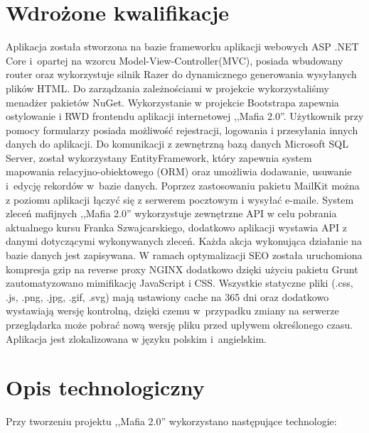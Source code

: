 \documentclass[12pt,a4paper]{article}
\begin{document}
	\section{Wdrożone kwalifikacje}	
		\indent Aplikacja została stworzona na bazie frameworku aplikacji webowych ASP .NET Core i~opartej na wzorcu Model-View-Controller(MVC), posiada wbudowany router oraz wykorzystuje
		silnik Razer do dynamicznego generowania wysyłanych plików HTML.
		Do zarządzania zależnościami w projekcie wykorzystaliśmy menadżer pakietów NuGet.
		Wykorzystanie w projekcie Bootstrapa zapewnia ostylowanie i RWD frontendu aplikacji internetowej ,,Mafia 2.0''.
		Użytkownik przy pomocy formularzy posiada możliwość rejestracji, logowania i przesyłania innych danych do aplikacji.
		Do komunikacji z zewnętrzną bazą danych Microsoft SQL Server, został wykorzystany EntityFramework, który zapewnia system mapowania relacyjno-obiektowego (ORM)
		oraz umożliwia dodawanie, usuwanie i~edycję rekordów w~bazie danych.
		Poprzez zastosowaniu pakietu MailKit można z poziomu aplikacji łączyć się z serwerem pocztowym i wysyłać e-maile.
		System zleceń mafijnych ,,Mafia 2.0'' wykorzystuje zewnętrzne API w celu pobrania aktualnego kursu Franka Szwajcarskiego, dodatkowo aplikacji wystawia API z danymi
		dotyczącymi wykonywanych zleceń.
		Każda akcja wykonująca działanie na bazie danych jest zapisywana.
		W ramach optymalizacji SEO została uruchomiona kompresja gzip na reverse proxy NGINX dodatkowo dzięki użyciu pakietu Grunt zautomatyzowano mimifikację JavaScript i CSS.
		Wszystkie statyczne pliki (.css, .js, .png, .jpg, .gif, .svg) mają ustawiony cache na 365 dni oraz dodatkowo wystawiają wersję kontrolną, dzięki czemu w~przypadku zmiany na serwerze
		przeglądarka może pobrać nową wersję pliku przed upływem określonego czasu. Aplikacja jest zlokalizowana w języku polskim i~angielskim.
	\newpage

	\section{Opis technologiczny}
		\indent Przy tworzeniu projektu ,,Mafia 2.0'' wykorzystano następujące technologie:
\end{document}
